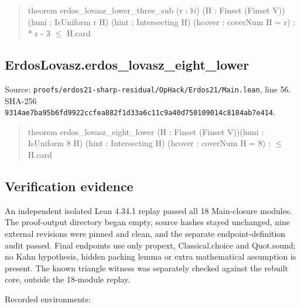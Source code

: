 \documentclass[11pt,a4paper]{article}
\begin{document}
\begin{quote}\small\ttfamily theorem erdos\_lovasz\_lower\_three\_sub (r : \ensuremath{\mathbb{N}}) (H : Finset (Finset V))\newline (huni : IsUniform r H) (hint : Intersecting H) (hcover : coverNum H = r) : * r - 3 \ensuremath{\leq} H.card\end{quote}
\subsection{ErdosLovasz.erdos\_lovasz\_eight\_lower}
Source: \texttt{proofs/erdos21-sharp-residual/OpHack/Erdos21/Main.lean}, line 56. SHA-256 \texttt{9314ae7ba95b6fd9922ccfea882f1d33a6c11c9a40d750109014c8184ab7e414}.

\begin{quote}\small\ttfamily theorem erdos\_lovasz\_eight\_lower (H : Finset (Finset V))\newline (huni : IsUniform 8 H) (hint : Intersecting H) (hcover : coverNum H = 8) : \ensuremath{\leq} H.card\end{quote}
\subsection{Verification evidence}
An independent isolated Lean 4.34.1 replay passed all 18 Main-closure modules. The proof-output directory began empty, source hashes stayed unchanged, nine external revisions were pinned and clean, and the separate endpoint-definition audit passed. Final endpoints use only propext, Classical.choice and Quot.sound; no Kahn hypothesis, hidden packing lemma or extra mathematical assumption is present. The known triangle witness was separately checked against the rebuilt core, outside the 18-module replay.

Recorded environments:
\end{document}
